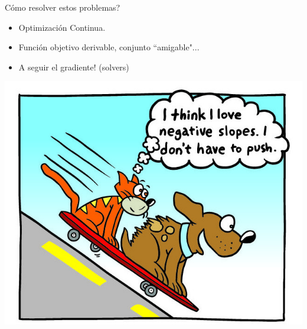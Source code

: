 \documentclass[12pt,aspectratio=169]{beamer}
\begin{document}
\begin{frame}{Cómo resolver estos problemas?}
\begin{itemize}
\item Optimización Continua.
\item Función objetivo derivable, conjunto ``amigable"...
\item A seguir el gradiente! (solvers)
\end{itemize}

\begin{center}
	\includegraphics[width=.35\paperwidth]{slope.jpg}
\end{center}
\end{frame}
\end{document}
